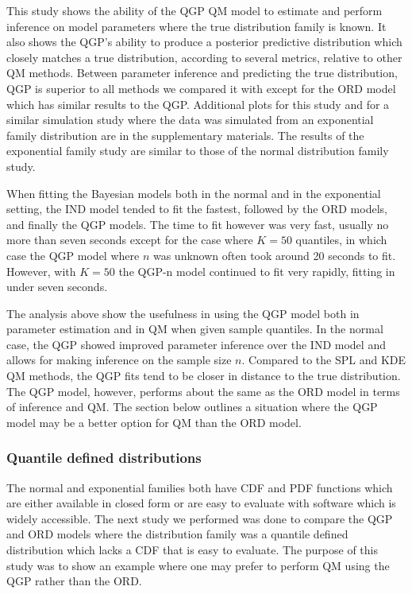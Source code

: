 \documentclass[preprint,12pt,authoryear]{elsarticle}
\newcommand{\1}[1]{\mathds{1}\left[#1\right]}
\begin{document}
This study shows the ability of the QGP QM model to estimate and perform 
inference on model parameters where the true distribution family is known. It 
also shows the QGP's ability to produce a posterior predictive distribution 
which closely matches a true distribution, according to several metrics, 
relative to other QM methods. Between parameter inference and predicting the 
true distribution, QGP is superior to all methods we compared it with except 
for the ORD model which has similar results to the QGP. 
Additional plots for this study and for a similar simulation 
study where the data was simulated from an exponential family distribution are 
in the supplementary materials.
The results of the exponential family study are similar to those of the 
normal distribution family study.




When fitting the Bayesian models both in the normal and in the exponential 
setting, the IND model tended to fit the fastest, followed by the ORD models, 
and finally the QGP models. The time to fit however was very fast, usually no 
more than seven seconds except for the case where $K = 50$ quantiles, in which 
case the QGP model where $n$ was unknown often took around 20 seconds to fit. 
However, with $K= 50$ the QGP-n model continued to fit very rapidly, fitting in 
under seven seconds.

The analysis above show the usefulness in using the QGP model both in parameter 
estimation and in QM when given sample quantiles. In the normal case, the QGP 
showed improved parameter inference over the IND model and allows for making 
inference on the sample size $n$. Compared to the SPL and KDE QM methods, the 
QGP fits tend to be closer in distance to the true distribution. The QGP model, 
however, performs about the same as the ORD model in terms of inference and QM. 
The section below outlines a situation where the QGP model may be a better 
option for QM than the ORD model. 


\subsubsection{Quantile defined distributions}
The normal and exponential families both have CDF and PDF functions which are 
either available in closed form or are easy to evaluate with software which is 
widely accessible. The next study we performed was done to compare the QGP and 
ORD models where the distribution family was a quantile defined distribution 
which lacks a CDF that is easy to evaluate. The purpose of this study was to 
show an example where one may prefer to perform QM using the QGP rather than 
the ORD.
\end{document}
